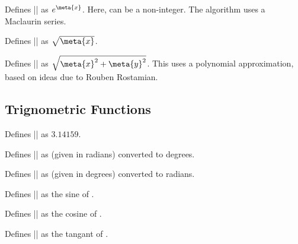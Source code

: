 \begin{command}{\pgfmathexp{}}                
	Defines |\pgfmathresult| as $e^{\meta{x}}$. Here,  can be a 
	non-integer. The algorithm	uses a Maclaurin series.               
\end{command}
	
\begin{command}{\pgfmathsqrt{}} 
	Defines |\pgfmathresult| as $\sqrt{\meta{x}}$. 
\end{command}
	
\begin{command}{\pgfmathveclen{}}        
	Defines |\pgfmathresult| as $\sqrt{\meta{x}^2+\meta{y}^2}$. This uses
	a polynomial approximation, based on ideas due to Rouben Rostamian.                                    
\end{command}

\subsection{Trignometric Functions}

\label{pgfmath-trigonmetry}

\begin{command}{\pgfmathpi}
  	Defines |\pgfmathresult| as $3.14159$.
\end{command}
   
\begin{command}{} 
	Defines |\pgfmathresult| as  (given in radians) converted to 
	degrees. 
\end{command}

\begin{command}{} 
	Defines |\pgfmathresult| as  (given in degrees) converted to 
	radians. 
\end{command}

\begin{command}{}  
	Defines |\pgfmathresult| as the sine of .  
\end{command}

\begin{command}{}
	Defines |\pgfmathresult| as the cosine of .
\end{command}

\begin{command}{}  
	Defines |\pgfmathresult| as the tangant of .  
\end{command}


